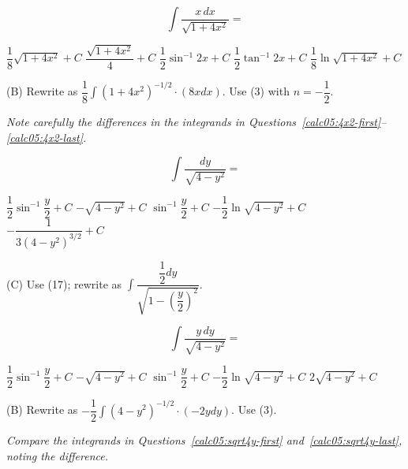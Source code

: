 \question\label{calc05:4x2-last}
\[
\displaystyle\int \dfrac{x \,dx}{\sqrt{1+4 x^{2}}}=
\]
\begin{choices}
  \choice $\dfrac{1}{8} \sqrt{1+4 x^{2}}+C$
  \CorrectChoice $\dfrac{\sqrt{1+4 x^{2}}}{4}+C$
  \choice $\dfrac{1}{2} \sin ^{-1} 2 x+C$
  \choice $\dfrac{1}{2} \tan ^{-1} 2 x+C$
  \choice $\dfrac{1}{8} \ln \sqrt{1+4 x^{2}}+C$
\end{choices}
\begin{solution}
(B) Rewrite as $\dfrac{1}{8} \displaystyle\int\left(1+4 x^{2}\right)^{-1 / 2} \cdot(8 x d x)$. Use (3) with $n=-\dfrac{1}{2}$.

\textit{Note carefully the differences in the integrands in Questions~\ref{calc05:4x2-first}--\ref{calc05:4x2-last}.}
\end{solution}





\newpage


\question\label{calc05:sqrt4y-first}
\[
\displaystyle\int \dfrac{d y}{\sqrt{4-y^{2}}}=
\]
\begin{choices}
  \choice $\dfrac{1}{2} \sin ^{-1} \dfrac{y}{2}+C$
  \choice $-\sqrt{4-y^{2}}+C$
  \CorrectChoice $\sin ^{-1} \dfrac{y}{2}+C$
  \choice $-\dfrac{1}{2} \ln \sqrt{4-y^{2}}+C$
  \choice $-\dfrac{1}{3\left(4-y^{2}\right)^{3 / 2}}+C$
\end{choices}
\begin{solution}
(C) Use (17); rewrite as $\displaystyle\int \dfrac{\dfrac{1}{2} d y}{\sqrt{1-\left(\dfrac{y}{2}\right)^{2}}}$.
\end{solution}

\question\label{calc05:sqrt4y-last}
\[
\displaystyle\int \dfrac{y \,dy}{\sqrt{4-y^{2}}}=
\]
\begin{choices}
  \choice $\dfrac{1}{2} \sin ^{-1} \dfrac{y}{2}+C$
  \CorrectChoice $-\sqrt{4-y^{2}}+C$
  \choice $\sin ^{-1} \dfrac{y}{2}+C$
  \choice $-\dfrac{1}{2} \ln \sqrt{4-y^{2}}+C$
  \choice $2 \sqrt{4-y^{2}}+C$
\end{choices}
\begin{solution}
(B) Rewrite as $-\dfrac{1}{2} \displaystyle\int\left(4-y^{2}\right)^{-1 / 2} \cdot(-2 y d y)$. Use (3).

\textit{Compare the integrands in Questions~\ref{calc05:sqrt4y-first} and~\ref{calc05:sqrt4y-last}, noting the difference.}
\end{solution}


\newpage





